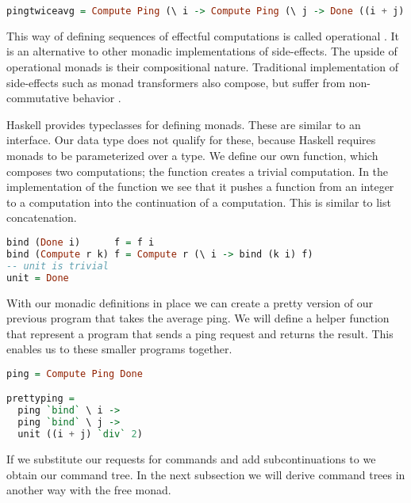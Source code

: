 \begin{lstlisting}[language=Haskell]
pingtwiceavg = Compute Ping (\ i -> Compute Ping (\ j -> Done ((i + j) `div` 2)))
\end{lstlisting}

This way of defining sequences of effectful computations is called operational \autocite{operationalmonad}. It is an alternative to other monadic implementations of side-effects. The upside of operational monads is their compositional nature. Traditional implementation of side-effects such as monad transformers \autocite{DBLP:conf/popl/LiangHJ95} also compose, but suffer from non-commutative behavior \autocite{DBLP:conf/ifl/DayH13}.

Haskell provides typeclasses for defining monads. These are similar to an interface. Our  data type does not qualify for these, because Haskell requires monads to be parameterized over a type. We define our own  function, which composes two computations; the  function creates a trivial computation. In the implementation of the  function we see that it pushes a function from an integer to a computation into the continuation of a computation. This is similar to list concatenation.

\begin{lstlisting}[language=Haskell]
bind (Done i)      f = f i
bind (Compute r k) f = Compute r (\ i -> bind (k i) f)
-- unit is trivial
unit = Done
\end{lstlisting}

With our monadic definitions in place we can create a pretty version of our previous program that takes the average ping. We will define a helper function that represent a program that sends a ping request and returns the result. This enables us to  these smaller programs together.

\begin{lstlisting}[language=Haskell]
ping = Compute Ping Done

prettyping =
  ping `bind` \ i ->
  ping `bind` \ j ->
  unit ((i + j) `div` 2)
\end{lstlisting}

If we substitute our requests for commands and add subcontinuations to  we obtain our command tree. In the next subsection we will derive command trees in another way with the free monad.

